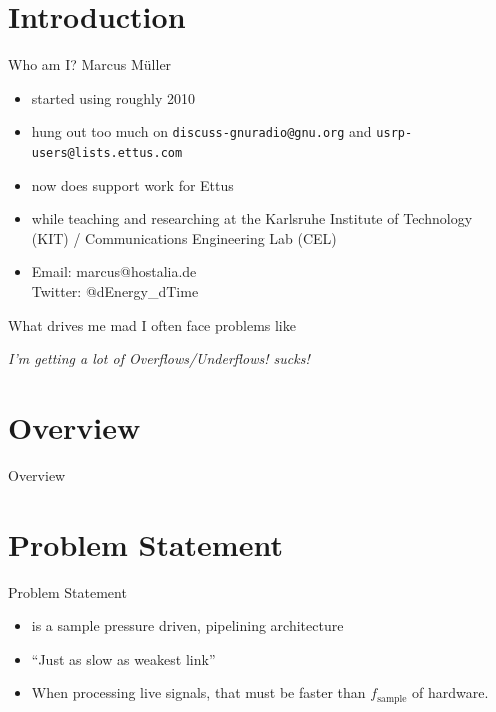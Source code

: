%
\section{Introduction}

\begin{frame}{Who am I?}
  Marcus Müller
  \begin{itemize}
  \item started using \GR roughly 2010
  \item hung out too much on \texttt{discuss-gnuradio@gnu.org} and
    \texttt{usrp-users@lists.ettus.com}
  \item now does support work for Ettus
  \item while teaching and researching at the Karlsruhe Institute of
    Technology (KIT) / Communications Engineering Lab (CEL)
  \item Email: marcus@hostalia.de\\Twitter: @dEnergy\_dTime
  \end{itemize}
\end{frame}
\begin{frame}{What drives me mad}
  I often face problems like
  
  \begin{center}
    {\textit{I'm getting a lot of Overflows/Underflows! \GR sucks!}}
  \end{center}
\end{frame}
\section*{Overview}

\begin{frame}{Overview}
  \tableofcontents

\end{frame}

\section{Problem Statement}
\begin{frame}{Problem Statement}

  \begin{itemize}
  \item \GR is a sample pressure driven, pipelining architecture
  \item ``Just as slow
    as weakest link''
  \item When processing live signals, that must be faster than
    $f_\text{sample}$ of hardware.
  \end{itemize}
\end{frame}


